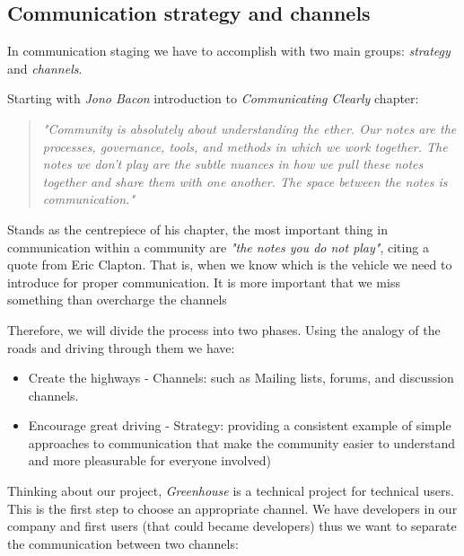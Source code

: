 \documentclass[11pt]{scrartcl}
\begin{document}

\subsection{Communication strategy and channels}
\label{sub:communication-strategy}

\par In communication staging we have to accomplish with two main groups: \emph{strategy} and \emph{channels}.

\par Starting with \emph{Jono Bacon}\cite{art-of-community} introduction to \emph{Communicating Clearly} chapter:
\begin{quotation}
    \emph{"Community is absolutely about understanding the ether. Our notes are the processes, governance, tools, and methods in which we work together. The notes we don’t play are the subtle nuances in how we pull these notes together and share them with one another. The space between the notes is communication."}
\end{quotation}

\par Stands as the centrepiece of his chapter, the most important thing in communication within a community are \emph{"the notes you do not play"}, citing a quote from Eric Clapton. That is, when we know which is the vehicle we need to introduce for proper communication. It is more important that we miss something than overcharge the channels

\par Therefore, we will divide the process into two phases. Using the analogy of the roads and driving through them we have:
\begin{itemize}
	\item Create the highways - Channels: such as Mailing lists, forums, and discussion channels.
    \item Encourage great driving - Strategy: providing a consistent example of simple approaches to communication that make the community easier to understand and more pleasurable for everyone involved)
\end{itemize}

\par Thinking about our project, \emph{Greenhouse} is a technical project for technical users. This is the first step to choose an appropriate channel. We have developers in our company and first users (that could became developers) thus we want to separate the communication between two channels:
\end{document}
